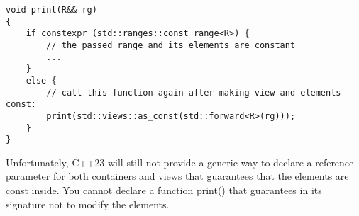 \begin{lstlisting}[style=styleCXX]
void print(R&& rg)
{
	if constexpr (std::ranges::const_range<R>) {
		// the passed range and its elements are constant
		...
	}
	else {
		// call this function again after making view and elements const:
		print(std::views::as_const(std::forward<R>(rg)));
	}
}
\end{lstlisting}

Unfortunately, C++23 will still not provide a generic way to declare a reference parameter for both containers and views that guarantees that the elements are const inside. You cannot declare a function print() that guarantees in its signature not to modify the elements.

